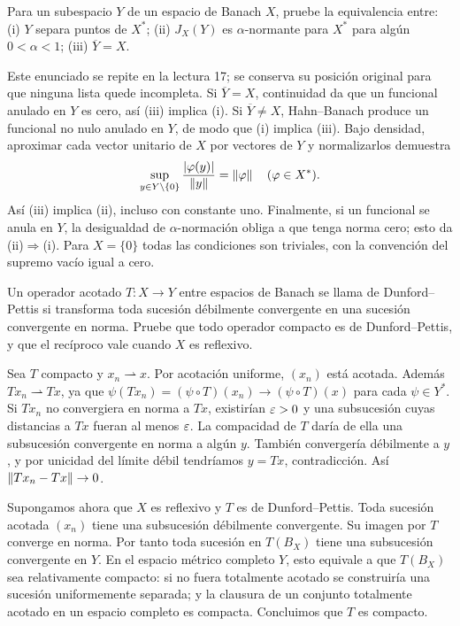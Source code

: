 \begin{ejercicio}\label{ej:v3-l18-4}
Para un subespacio $Y$ de un espacio de Banach $X$, pruebe la equivalencia entre: (i) $Y$ separa puntos de $X^*$; (ii) $J_X(Y)$ es $\alpha$-normante para $X^*$ para algún $0<\alpha<1$; (iii) $\overline Y=X$.
\end{ejercicio}
\begin{solucion}
Este enunciado se repite en la lectura 17; se conserva su posición original para que ninguna lista quede incompleta. Si $\overline Y=X$, continuidad da que un funcional anulado en $Y$ es cero, así (iii) implica (i). Si $\overline Y\ne X$, Hahn--Banach produce un funcional no nulo anulado en $Y$, de modo que (i) implica (iii). Bajo densidad, aproximar cada vector unitario de $X$ por vectores de $Y$ y normalizarlos demuestra
\[
 \sup_{y\in Y\setminus\{0\}}\frac{|\varphi(y)|}{\left\lVert y\right\rVert}=\left\lVert\varphi\right\rVert
 \quad(\varphi\in X^*).
\]
Así (iii) implica (ii), incluso con constante uno. Finalmente, si un funcional se anula en $Y$, la desigualdad de $\alpha$-normación obliga a que tenga norma cero; esto da (ii)$\Rightarrow$(i). Para $X=\{0\}$ todas las condiciones son triviales, con la convención del supremo vacío igual a cero.
\end{solucion}

\begin{ejercicio}\label{ej:v3-l18-5}
Un operador acotado $T:X\to Y$ entre espacios de Banach se llama de Dunford--Pettis si transforma toda sucesión débilmente convergente en una sucesión convergente en norma. Pruebe que todo operador compacto es de Dunford--Pettis, y que el recíproco vale cuando $X$ es reflexivo.
\end{ejercicio}
\begin{solucion}
Sea $T$ compacto y $x_n\rightharpoonup x$. Por acotación uniforme, $(x_n)$ está acotada. Además $Tx_n\rightharpoonup Tx$, ya que $\psi(Tx_n)=(\psi\circ T)(x_n)\to(\psi\circ T)(x)$ para cada $\psi\in Y^*$. Si $Tx_n$ no convergiera en norma a $Tx$, existirían $\varepsilon>0$ y una subsucesión cuyas distancias a $Tx$ fueran al menos $\varepsilon$. La compacidad de $T$ daría de ella una subsucesión convergente en norma a algún $y$. También convergería débilmente a $y$, y por unicidad del límite débil tendríamos $y=Tx$, contradicción. Así $\left\lVert Tx_n-Tx\right\rVert\to0$.

Supongamos ahora que $X$ es reflexivo y $T$ es de Dunford--Pettis. Toda sucesión acotada $(x_n)$ tiene una subsucesión débilmente convergente. Su imagen por $T$ converge en norma. Por tanto toda sucesión en $T(B_X)$ tiene una subsucesión convergente en $Y$. En el espacio métrico completo $Y$, esto equivale a que $T(B_X)$ sea relativamente compacto: si no fuera totalmente acotado se construiría una sucesión uniformemente separada; y la clausura de un conjunto totalmente acotado en un espacio completo es compacta. Concluimos que $T$ es compacto.
\end{solucion}

